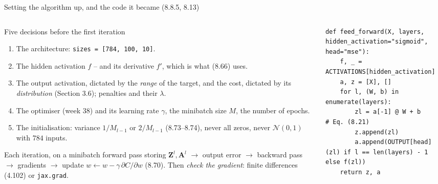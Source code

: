 \documentclass[10pt,aspectratio=169]{beamer}
\begin{document}
\begin{frame}[fragile]{Setting the algorithm up, and the code it became (8.8.5, 8.13)}
\vspace{-3pt}
\begin{columns}[T]
\begin{column}{0.44\textwidth}
\begin{block}{Five decisions before the first iteration}
\scriptsize
\begin{enumerate}
  \item The architecture: \texttt{sizes = [784, 100, 10]}.
  \item The hidden activation $f$ -- and its derivative $f'$, which is what
        (8.66) uses.
  \item The output activation, dictated by the \emph{range} of the target,
        and the cost, dictated by its \emph{distribution} (Section 3.6);
        penalties and their $\lambda$.
  \item The optimiser (week 38) and its learning rate $\gamma$, the minibatch
        size $M$, the number of epochs.
  \item The initialisation: variance $1/M_{l-1}$ or $2/M_{l-1}$ (8.73--8.74),
        never all zeros, never $\mathcal{N}(0,1)$ with $784$ inputs.
\end{enumerate}
\end{block}
\begin{block}{Each iteration, on a minibatch}
\scriptsize
forward pass storing $\bm{Z}^{l},\bm{A}^{l}$ $\to$ output error $\to$
backward pass $\to$ gradients $\to$ update $w\leftarrow w-\gamma\,\partial
C/\partial w$ (8.70).  Then \emph{check the gradient}: finite differences
(4.102) or \texttt{jax.grad}.
\end{block}
\end{column}
\begin{column}{0.56\textwidth}
\lstset{basicstyle=\ttfamily\tiny}
\begin{lstlisting}
def feed_forward(X, layers, hidden_activation="sigmoid", head="mse"):
    f, _ = ACTIVATIONS[hidden_activation]
    a, z = [X], []
    for l, (W, b) in enumerate(layers):
        zl = a[-1] @ W + b                       # Eq. (8.21)
        z.append(zl)
        a.append(OUTPUT[head](zl) if l == len(layers) - 1 else f(zl))
    return z, a


\end{lstlisting}
\end{column}
\end{columns}
\end{frame}
\end{document}
